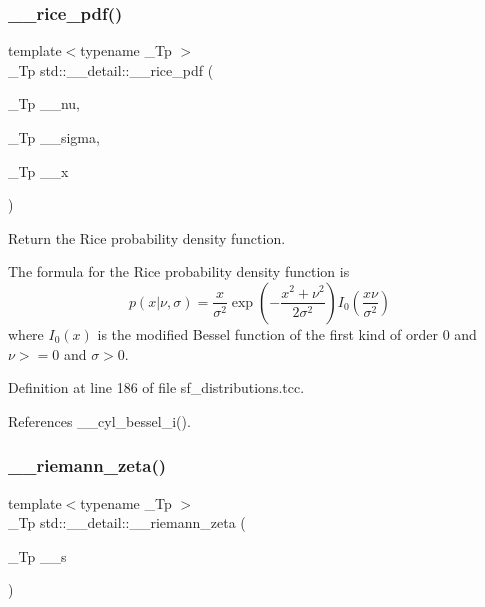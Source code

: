 \subsubsection{\texorpdfstring{\+\_\+\+\_\+rice\+\_\+pdf()}{\_\_rice\_pdf()}}
{\footnotesize\ttfamily template$<$typename \+\_\+\+Tp $>$ \\
\+\_\+\+Tp std\+::\+\_\+\+\_\+detail\+::\+\_\+\+\_\+rice\+\_\+pdf (\begin{DoxyParamCaption}\item[{\+\_\+\+Tp}]{\+\_\+\+\_\+nu,  }\item[{\+\_\+\+Tp}]{\+\_\+\+\_\+sigma,  }\item[{\+\_\+\+Tp}]{\+\_\+\+\_\+x }\end{DoxyParamCaption})}



Return the Rice probability density function. 

The formula for the Rice probability density function is \[ p(x|\nu,\sigma) = \frac{x}{\sigma^2} \exp\left(-\frac{x^2+\nu^2}{2\sigma^2}\right) I_0\left(\frac{x \nu}{\sigma^2}\right) \] where $I_0(x)$ is the modified Bessel function of the first kind of order 0 and $\nu >= 0$ and $\sigma > 0$. 

Definition at line 186 of file sf\+\_\+distributions.\+tcc.



References \+\_\+\+\_\+cyl\+\_\+bessel\+\_\+i().

\mbox{\label{namespacestd_1_1____detail_a2be77d9bdd1b8b463be44a0e7558bc2a}} 
\subsubsection{\texorpdfstring{\+\_\+\+\_\+riemann\+\_\+zeta()}{\_\_riemann\_zeta()}}
{\footnotesize\ttfamily template$<$typename \+\_\+\+Tp $>$ \\
\+\_\+\+Tp std\+::\+\_\+\+\_\+detail\+::\+\_\+\+\_\+riemann\+\_\+zeta (\begin{DoxyParamCaption}\item[{\+\_\+\+Tp}]{\+\_\+\+\_\+s }\end{DoxyParamCaption})}



